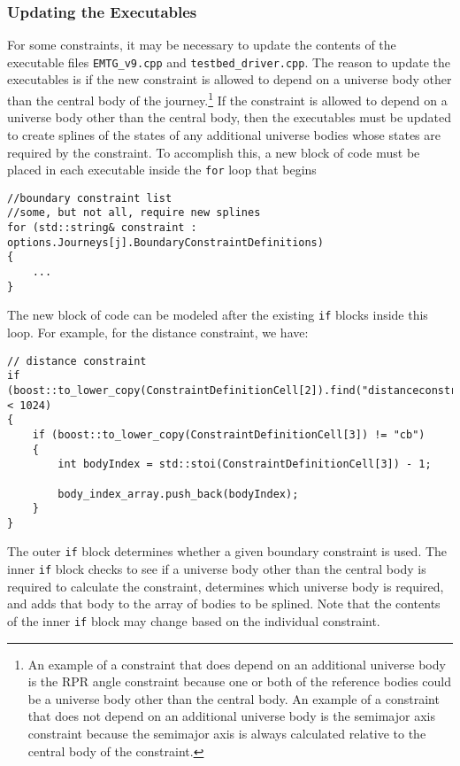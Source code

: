 \documentclass[11pt]{article}
\begin{document}
\subsubsection{Updating the Executables}
\label{sec:UpdatingTheExecutables}

For some constraints, it may be necessary to update the contents of the executable files \texttt{EMTG\_v9.cpp} and \texttt{testbed\_driver.cpp}. The reason to update the executables is if the new constraint is allowed to depend on a universe body other than the central body of the journey.\footnote{An example of a constraint that does depend on an additional universe body is the RPR angle constraint because one or both of the reference bodies could be a universe body other than the central body. An example of a constraint that does not depend on an additional universe body is the semimajor axis constraint because the semimajor axis is always calculated relative to the central body of the constraint.} If the constraint is allowed to depend on a universe body other than the central body, then the executables must be updated to create splines of the states of any additional universe bodies whose states are required by the constraint. To accomplish this, a new block of code must be placed in each executable inside the \texttt{for} loop that begins

\begin{verbatim}
//boundary constraint list
//some, but not all, require new splines
for (std::string& constraint : options.Journeys[j].BoundaryConstraintDefinitions)
{
	...
}
\end{verbatim}

The new block of code can be modeled after the existing \texttt{if} blocks inside this loop. For example, for the distance constraint, we have:

\begin{verbatim}
// distance constraint
if (boost::to_lower_copy(ConstraintDefinitionCell[2]).find("distanceconstraint") < 1024)
{
	if (boost::to_lower_copy(ConstraintDefinitionCell[3]) != "cb")
	{
		int bodyIndex = std::stoi(ConstraintDefinitionCell[3]) - 1;

		body_index_array.push_back(bodyIndex);
	}
}
\end{verbatim}

The outer \texttt{if} block determines whether a given boundary constraint is used. The inner \texttt{if} block checks to see if a universe body other than the central body is required to calculate the constraint, determines which universe body is required, and adds that body to the array of bodies to be splined. Note that the contents of the inner \texttt{if} block may change based on the individual constraint.
\end{document}
